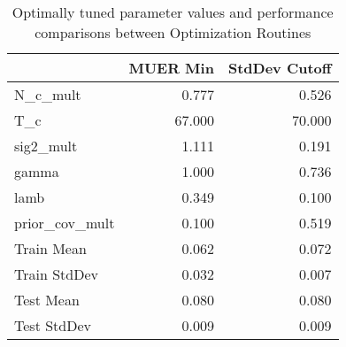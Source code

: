   \begin{table}[!h]
	  \centering
\begin{tabular}{|l|rr|}
\toprule
{} &  MUER Min &  StdDev Cutoff \\
\midrule
N\_c\_mult       &     0.777 &          0.526 \\
T\_c            &    67.000 &         70.000 \\
sig2\_mult      &     1.111 &          0.191 \\
gamma          &     1.000 &          0.736 \\
lamb           &     0.349 &          0.100 \\
prior\_cov\_mult &     0.100 &          0.519 \\
\midrule
Train Mean     &     0.062 &          0.072 \\
Train StdDev   &     0.032 &          0.007 \\
Test Mean      &     0.080 &          0.080 \\
Test StdDev    &     0.009 &          0.009 \\
\bottomrule
\end{tabular}
\caption{Optimally tuned parameter values and performance comparisons between Optimization Routines}
\end{table}


